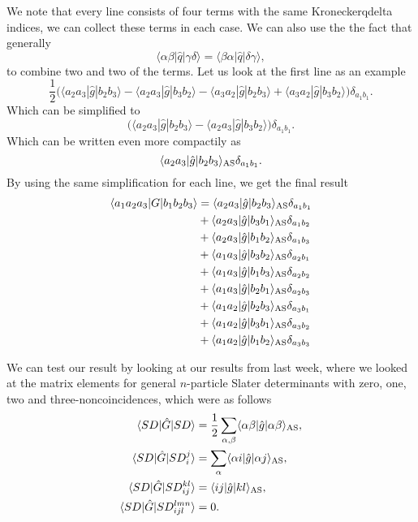 \documentclass[a4paper, 11pt, notitlepage, english]{article}
\newcommand{\op}[1]{\hat{#1}}
\newcommand{\braopket}[3]{\langle #1 | {#2} | #3 \rangle}
\begin{document}
We note that every line consists of four terms with the same Kroneckerqdelta indices, we can collect these terms in each case. We can also use the the fact that generally
$$\braopket{\alpha \beta}{\op{q}}{\gamma \delta} = \braopket{\beta \alpha}{\op{q}}{\delta \gamma},$$
to combine two and two of the terms. Let us look at the first line as an example
$$
\frac{1}{2}\big(\braopket{a_2 a_3}{\op{g}}{b_2 b_3} 
- \braopket{a_2 a_3}{\op{g}}{b_3 b_2} 
- \braopket{a_3 a_2}{\op{g}}{b_2 b_3} 
+ \braopket{a_3 a_2}{\op{g}}{b_3 b_2}\big)\delta_{a_{1} b_{1}}.
$$
Which can be simplified to
$$\big(\braopket{a_2 a_3}{\op{g}}{b_2 b_3} - \braopket{a_2 a_3}{\op{g}}{b_3 b_2}\big)\delta_{a_{1}b_{1}}.$$
Which can be written even more compactily as
$$\braopket{a_2 a_3}{\op{g}}{b_2 b_3}_{\rm AS} \delta_{a_1b_1}.$$
By using the same simplification for each line, we get the final result
\begin{align*}		
\braopket{a_1a_2a_3}{G}{b_1b_2b_3} &= 
   \braopket{a_2 a_3}{\op{g}}{b_2 b_3}_{\rm AS} \delta_{a_1b_1} \\
&+ \braopket{a_2 a_3}{\op{g}}{b_3 b_1}_{\rm AS} \delta_{a_1b_2}  \\
&+  \braopket{a_2 a_3}{\op{g}}{b_1 b_2}_{\rm AS} \delta_{a_1b_3} \\ 
&+ \braopket{a_1 a_3}{\op{g}}{b_3 b_2}_{\rm AS} \delta_{a_2b_1}  \\
&+  \braopket{a_1 a_3}{\op{g}}{b_1 b_3}_{\rm AS} \delta_{a_2b_2} \\ 
&+ \braopket{a_1 a_3}{\op{g}}{b_2 b_1}_{\rm AS} \delta_{a_2b_3}  \\
&+  \braopket{a_1 a_2}{\op{g}}{b_2 b_3}_{\rm AS} \delta_{a_3b_1} \\ 
&+ \braopket{a_1 a_2}{\op{g}}{b_3 b_1}_{\rm AS} \delta_{a_3b_2}  \\
&+  \braopket{a_1 a_2}{\op{g}}{b_1 b_2}_{\rm AS} \delta_{a_3b_3}  
\end{align*}

We can test our result by looking at our results from last week, where we looked at the matrix elements for general $n$-particle Slater determinants with zero, one, two and three-noncoincidences, which were as follows
\begin{align*}
\braopket{SD}{\op{G}}{SD}
&=  \frac{1}{2}\sum_{\alpha,\beta} \braopket{\alpha\beta}{\op{g}}{\alpha\beta}_{\rm AS},\\
\braopket{SD}{\op{G}}{SD_i^j}
&= \sum_{\alpha} \braopket{\alpha i}{\op{g}}{\alpha j}_{\rm AS}, \\
\braopket{SD}{\op{G}}{SD_{ij}^{kl}} &= \braopket{ij}{\op{g}}{kl}_{\rm AS}, \\
\braopket{SD}{\op{G}}{SD_{ijl}^{lmn}} &= 0.
\end{align*}
\end{document}
